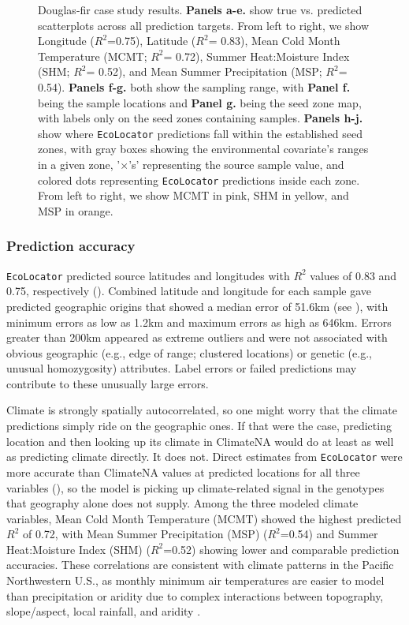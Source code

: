 \documentclass[]{article}
\newcommand{\dfir}{Douglas-fir\xspace}
\newcommand{\ecolocator}{\texttt{EcoLocator}\xspace}
\begin{document}
\begin{figure}[H]
    \caption{\dfir case study results. \textbf{Panels a-e.} show true
    vs. predicted scatterplots across all prediction targets. From left to right,
    we show Longitude ($R^2$=0.75), Latitude ($R^2$= 0.83), 
    Mean Cold Month Temperature (MCMT; $R^2$= 0.72), Summer Heat:Moisture Index 
    (SHM; $R^2$= 0.52), and Mean Summer Precipitation (MSP; $R^2$= 0.54).
    \textbf{Panels f-g.}
    both show the sampling range, with \textbf{Panel f.} being the sample locations
    and \textbf{Panel g.} being the seed zone map, with labels only on the seed 
    zones containing samples.
    \textbf{Panels h-j.} show where \ecolocator predictions fall within the 
    established seed zones, with gray boxes showing the environmental covariate's ranges in a
    given zone, '$\times$'s' representing the source sample value, and colored dots representing \ecolocator 
    predictions inside each zone. From left to right, we show MCMT in pink, SHM 
    in yellow, and MSP in orange. 
    }
    \label{fig:dfir-results}
\end{figure}


\subsubsection*{Prediction accuracy}

\ecolocator predicted source latitudes and longitudes with $R^2$
values of 0.83 and 0.75, respectively (). Combined latitude
and longitude for each sample gave predicted geographic origins that showed a median error of 51.6km (see ), with
minimum errors as low as 1.2km and maximum errors as high as 646km. Errors
greater than 200km appeared as extreme outliers and were not associated with obvious
geographic (e.g., edge of range; clustered locations) or genetic (e.g., unusual homozygosity)
attributes. Label errors or failed predictions may contribute to these unusually large errors. 

Climate is strongly spatially autocorrelated,
so one might worry that the climate predictions simply ride on the geographic ones.
If that were the case, predicting location and then looking up its
climate in ClimateNA would do at least as well as predicting climate directly.
It does not. Direct estimates from \ecolocator
were more accurate than ClimateNA values at predicted locations
for all three variables (),
so the model is picking up climate-related signal in the genotypes
that geography alone does not supply. Among the three modeled climate variables,
Mean Cold Month Temperature (MCMT) showed the highest predicted $R^2$ of 0.72, with Mean Summer
Precipitation (MSP) ($R^2$=0.54) and Summer Heat:Moisture Index (SHM) ($R^2$=0.52)
showing lower and comparable prediction accuracies. These correlations are consistent 
with climate patterns in the Pacific Northwestern U.S., as monthly minimum air temperatures
are easier to model than precipitation or aridity due to complex interactions
between topography, slope/aspect, local rainfall, and aridity \citep{frankson_oregon_2022}.
\end{document}
